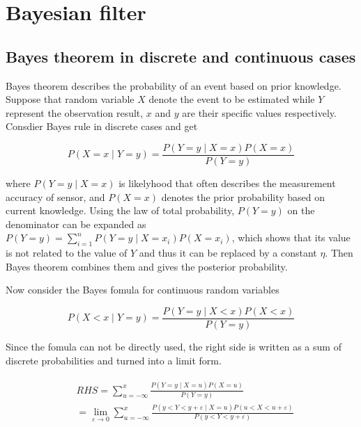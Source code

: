 \documentclass[conference]{IEEEtran}
\begin{document}
	\section{Bayesian filter}
	
	\subsection{Bayes theorem in discrete and continuous cases}
	
	Bayes theorem describes the probability of an event based on prior knowledge. Suppose that random variable $X$ denote the event to be estimated while $Y$ represent the observation result, $x$ and $y$ are their specific values respectively. Consdier Bayes rule in discrete cases and get
	
	\begin{equation}
		P(X=x\mid Y=y)=\frac{P(Y=y\mid X=x)P(X=x)}{P(Y=y)}
		\label{eq1}
	\end{equation}
	
	where $P(Y=y\mid X=x)$ is likelyhood that often describes the measurement accuracy of sensor, and $P(X=x)$ denotes the prior probability based on current knowledge. Using the law of total probability, $P(Y=y)$ on the denominator can be expanded as $P(Y=y)=\sum_{i=1}^{n}P(Y=y \mid X=x_{i})P(X=x_{i})$, which shows that its value is not related to the value of $Y$ and thus it can be replaced by a constant $\eta $. Then Bayes theorem combines them and gives the posterior probability.
	
	Now consider the Bayes fomula for continuous random variables
	
	\begin{equation}
	P(X<x\mid Y=y)=\frac{P(Y=y\mid X<x)P(X<x)}{P(Y=y)}
	\label{eq2}
	\end{equation}
	
	Since the fomula can not be directly used, the right side is written as a sum of discrete probabilities and turned into a limit form. 
	
	\begin{equation}
	\begin{split}
	\begin{aligned}
	&RHS=\sum_{u=-\infty}^{x}\frac{P(Y=y\mid X=u)P(X=u)}{P(Y=y)}
	\\
	&=\lim_{\varepsilon \rightarrow 0}\sum_{u=-\infty}^{x}\frac{P(y<Y<y+\varepsilon \mid X=u)P(u<X<u+\varepsilon )}{P(y<Y<y+\varepsilon )}
	\nonumber
	\end{aligned}
	\end{split}
	\end{equation}
	
\end{document}
